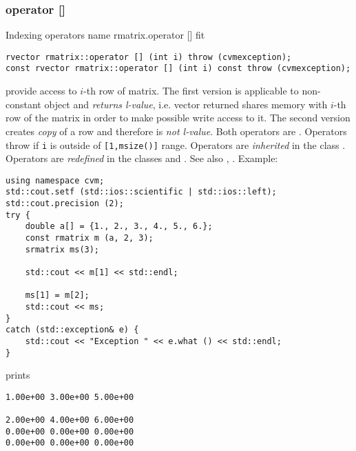 \subsubsection{operator []}
Indexing operators%
\pdfdest name {rmatrix.operator []} fit
\begin{verbatim}
rvector rmatrix::operator [] (int i) throw (cvmexception);
const rvector rmatrix::operator [] (int i) const throw (cvmexception);
\end{verbatim}
provide access to  \hbox{$i$-th} row of  matrix. The first version
is applicable to non-constant object and
\emph{returns  l-value}, i.e. vector returned shares  memory
with  \hbox{$i$-th} row of the matrix
in order to make possible write access to it.
The second version creates \emph{copy} of a row and therefore is
\emph{not  l-value}.
Both operators are \Based.
Operators throw 
if \verb"i" is outside of \verb"[1,msize()]" range.
Operators are \emph{inherited}
in  the class
.
Operators are \emph{redefined}
in  the classes 
and .
See also ,
.
Example:
\begin{Verbatim}
using namespace cvm;
std::cout.setf (std::ios::scientific | std::ios::left);
std::cout.precision (2);
try {
    double a[] = {1., 2., 3., 4., 5., 6.};
    const rmatrix m (a, 2, 3);
    srmatrix ms(3);

    std::cout << m[1] << std::endl;

    ms[1] = m[2];
    std::cout << ms;
}
catch (std::exception& e) {
    std::cout << "Exception " << e.what () << std::endl;
}
\end{Verbatim}
prints
\begin{Verbatim}
1.00e+00 3.00e+00 5.00e+00

2.00e+00 4.00e+00 6.00e+00
0.00e+00 0.00e+00 0.00e+00
0.00e+00 0.00e+00 0.00e+00
\end{Verbatim}
\newpage



